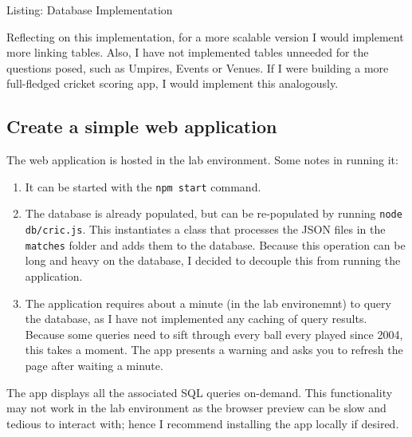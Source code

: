 \begin{listing}[H]
    \tiny
    \caption{Listing: Database Implementation}
    \label{lis:db}
    
\end{listing}

Reflecting on this implementation, for a more scalable version I would implement more linking tables. Also, I have not implemented tables unneeded for the questions posed, such as Umpires, Events or Venues. If I were building a more full-fledged cricket scoring app, I would implement this analogously.

\subsection{Create a simple web application}

The web application is hosted in the lab environment. Some notes in running it:

\begin{enumerate}
    \item It can be started with the \texttt{npm start} command.
    \item The database is already populated, but can be re-populated by running \texttt{node db/cric.js}. This instantiates a class that processes the JSON files in the \texttt{matches} folder and adds them to the database. Because this operation can be long and heavy on the database, I decided to decouple this from running the application.
    \item The application requires about a minute (in the lab environemnt) to query the database, as I have not implemented any caching of query results. Because some queries need to sift through every ball every played since 2004, this takes a moment. The app presents a warning and asks you to refresh the page after waiting a minute.
\end{enumerate}

The app displays all the associated SQL queries on-demand. This functionality may not work in the lab environment as the browser preview can be slow and tedious to interact with; hence I recommend installing the app locally if desired.


